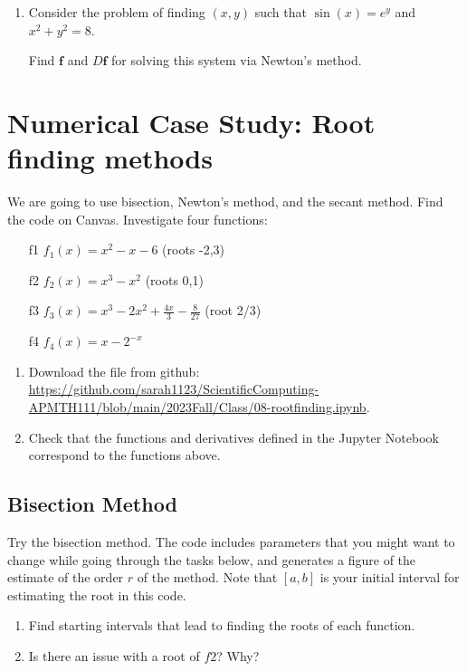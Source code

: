 \documentclass[12pt,letterpaper,noanswers]{exam}
\begin{document}
\begin{enumerate}[resume]
\item Consider the problem of finding $(x,y)$ such that $\sin(x) = e^y$ and $x^2 + y^2 = 8$.

Find $\mathbf{f}$ and $D\mathbf{f}$ for solving this system via Newton's method.
\end{enumerate}



\eject
\section*{Numerical Case Study: Root finding methods}

We are going to use bisection, Newton's method, and the secant method.  Find the code on Canvas.  Investigate four functions:
\begin{enumerate}
\item[f1] $f_1(x) = x^2 - x - 6$ (roots -2,3)
\item[f2] $f_2(x) = x^3 - x^2$ (roots 0,1)
\item[f3] $f_3(x) = x^3 - 2x^2 + \frac{4x}{3} - \frac{8}{27}$ (root 2/3)
\item[f4] $f_4(x) = x - 2^{-x}$
\end{enumerate}
\begin{enumerate}[resume=classQ]
    \item Download the file from github: \url{https://github.com/sarah1123/ScientificComputing-APMTH111/blob/main/2023Fall/Class/08-rootfinding.ipynb}.
    \item Check that the functions and derivatives defined in the Jupyter Notebook correspond to the functions above.
\end{enumerate}



\subsection*{Bisection Method}

\noindent
Try the bisection method. The code includes parameters that you might want to change while going through the tasks below, and generates a figure of the estimate of the order $r$ of the method.  Note that $[a,b]$ is your initial interval for estimating the root in this code. 

\begin{enumerate}[resume=classQ]
\item Find starting intervals that lead to finding the roots of each function.

\vfill

\item Is there an issue with a root of $f2$? Why?

\vfill



\end{enumerate}
\end{document}
